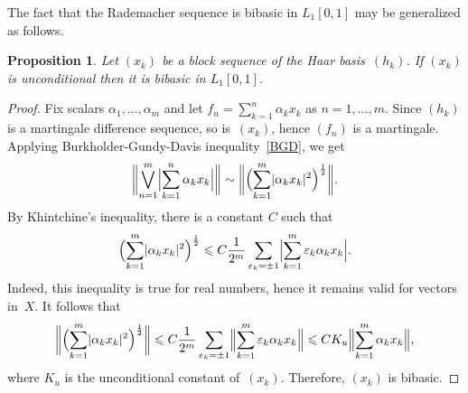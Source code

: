 \documentclass[12pt]{amsart}
\theoremstyle{plain}
\newtheorem{proposition}[theorem]{Proposition}
\theoremstyle{definition}
\newcommand{\abs}[1]{\lvert#1\rvert}
\newcommand{\bignorm}[1]{\bigl\lVert#1\bigr\rVert}
\newcommand{\Bigabs}[1]{\Bigl\lvert#1\Bigr\rvert}
\newcommand{\Bignorm}[1]{\Bigl\lVert#1\Bigr\rVert}
\newcommand{\biggnorm}[1]{\biggl\lVert#1\biggr\rVert}
\renewcommand{\le}{\leqslant}
\begin{document}
The fact that the Rademacher sequence is bibasic in $L_1[0,1]$ may be
generalized as follows.

\begin{proposition}\label{unc-bib-L1}
  Let $(x_k)$ be a block sequence of the Haar basis~$(h_k)$. If $(x_k)$
  is unconditional then it is bibasic in $L_1[0,1]$.
\end{proposition}

\begin{proof}
  Fix scalars $\alpha_1,\dots,\alpha_m$ and let
  $f_n=\sum_{k=1}^n\alpha_kx_k$ as $n=1,\dots,m$.  Since $(h_k)$ is a
  martingale difference sequence, so is~$(x_k)$, hence $(f_n)$ is a
  martingale. Applying Burkholder-Gundy-Davis inequality~\eqref{BGD},
  we get
  \begin{displaymath}
    \biggnorm{\bigvee_{n=1}^m\Bigabs{\sum_{k=1}^n\alpha_kx_k}}
    \sim\biggnorm{\Bigl(\sum_{k=1}^m\abs{\alpha_kx_k}^2\Bigr)^{\frac12}}.
  \end{displaymath}
  By Khintchine's inequality, there is a constant $C$ such that
  \begin{displaymath}
    \Bigl(\sum_{k=1}^m\abs{\alpha_kx_k}^2\Bigr)^{\frac12}
    \le C\frac{1}{2^m}\sum_{\varepsilon_k=\pm 1}
    \Bigabs{\sum_{k=1}^m\varepsilon_k\alpha_kx_k}.
  \end{displaymath}
  Indeed, this inequality is true for real numbers, hence it remains
  valid for vectors in~$X$. It follows that
  \begin{displaymath}
    \biggnorm{\Bigl(\sum_{k=1}^m\abs{\alpha_kx_k}^2\Bigr)^{\frac12}}
    \le C\frac{1}{2^m}\sum_{\varepsilon_k=\pm 1}
    \Bignorm{\sum_{k=1}^m\varepsilon_k\alpha_kx_k}
    \le CK_u\Bignorm{\sum_{k=1}^m\alpha_kx_k},
  \end{displaymath}
  where $K_u$ is the unconditional constant of~$(x_k)$.
  Therefore, $(x_k)$ is bibasic.
\end{proof}
\end{document}
